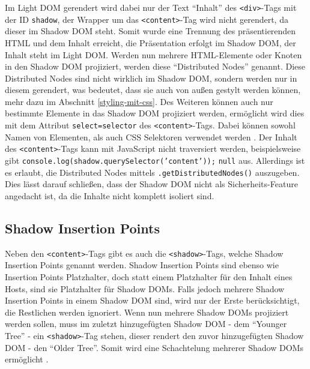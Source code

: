 Im Light \ac{DOM} gerendert wird dabei nur der Text ``Inhalt'' des \texttt{\textless{}div\textgreater{}}-Tags mit der ID \texttt{shadow}, der Wrapper um das \texttt{\textless{}content\textgreater{}}-Tag wird nicht gerendert, da dieser im Shadow \ac{DOM} steht. Somit wurde eine Trennung des präsentierenden \ac{HTML} und dem Inhalt erreicht, die Präsentation erfolgt im Shadow \ac{DOM}, der Inhalt steht im Light \ac{DOM}. Werden nun mehrere \ac{HTML}-Elemente oder Knoten in den Shadow \ac{DOM} projiziert, werden diese ``Distributed Nodes'' genannt. Diese Distributed Nodes sind nicht wirklich im Shadow \ac{DOM}, sondern werden nur in diesem gerendert, was bedeutet, dass sie auch von außen gestylt werden können, mehr dazu im Abschnitt \ref{styling-mit-css}. Des Weiteren können auch nur bestimmte Elemente in das Shadow \ac{DOM} projiziert werden, ermöglicht wird dies mit dem Attribut \texttt{select=\dq selector\dq} des \texttt{\textless{}content\textgreater{}}-Tags. Dabei können sowohl Namen von Elementen, als auch \ac{CSS} Selektoren verwendet werden \cite{citeulike:13851402}. Der Inhalt des \texttt{\textless{}content\textgreater{}}-Tags kann mit JavaScript nicht traversiert werden, beispielsweise gibt \texttt{console.log(shadow.querySelector('content'));} \texttt{null} aus. Allerdings ist es erlaubt, die Distributed Nodes mittels \texttt{.getDistributedNodes()} auszugeben. Dies lässt darauf schließen, dass der Shadow \ac{DOM} nicht als Sicherheits-Feature angedacht ist, da die Inhalte nicht komplett isoliert sind.

\subsection{Shadow Insertion Points}\label{shadow-insertion-points}

Neben den \texttt{\textless{}content\textgreater{}}-Tags gibt es auch die \texttt{\textless{}shadow\textgreater{}}-Tags, welche Shadow Insertion Points genannt werden. Shadow Insertion Points sind ebenso wie Insertion Points Platzhalter, doch statt einem Platzhalter für den Inhalt eines Hosts, sind sie Platzhalter für Shadow \ac{DOM}s. Falls jedoch mehrere Shadow Insertion Points in einem Shadow \ac{DOM} sind, wird nur der Erste berücksichtigt, die Restlichen werden ignoriert. Wenn nun mehrere Shadow \ac{DOM}s projiziert werden sollen, muss im zuletzt hinzugefügten Shadow \ac{DOM} - dem ``Younger Tree'' - ein \texttt{\textless{}shadow\textgreater{}}-Tag stehen, dieser rendert den zuvor hinzugefügten Shadow \ac{DOM} - den ``Older Tree''. Somit wird eine Schachtelung mehrerer Shadow \ac{DOM}s ermöglicht \cite{citeulike:13851421}.

